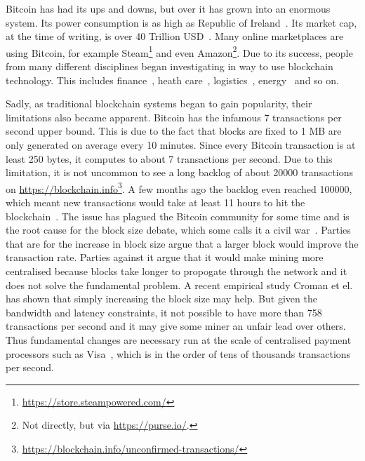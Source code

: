 Bitcoin has had its ups and downs, but over it has grown into an enormous system.
Its power consumption is as high as Republic of Ireland~\cite{o2014bitcoin}.
Its market cap, at the time of writing, is over 40 Trillion USD~\cite{bitcoinmarketcap}.
Many online marketplaces are using Bitcoin, for example Steam\footnote{\url{https://store.steampowered.com/}} and even Amazon\footnote{Not directly, but via \url{https://purse.io/}.}.
Due to its success, people from many different disciplines began investigating in way to use blockchain technology.
This includes finance~\cite{todo}, heath care~\cite{todo}, logistics~\cite{todo}, energy~\cite{todo} and so on.

Sadly, as traditional blockchain systems began to gain popularity,
their limitations also became apparent.
Bitcoin has the infamous 7 transactions per second upper bound.
This is due to the fact that blocks are fixed to 1 MB are only generated on average every 10 minutes.
Since every Bitcoin transaction is at least 250 bytes, it computes to about 7 transactions per second.
Due to this limitation, it is not uncommon to see a long backlog of about 20000 transactions on \url{https://blockchain.info}\footnote{\url{https://blockchain.info/unconfirmed-transactions/}}.
A few months ago the backlog even reached 100000, which meant new transactions would take at least 11 hours to hit the blockchain~\cite{bitcoinbacklog}.
The issue has plagued the Bitcoin community for some time and is the root cause for the block size debate, which some calls it a civil war~\cite{bitcoincivilwar}.
Parties that are for the increase in block size argue that a larger block would improve the transaction rate.
Parties against it argue that it would make mining more centralised because blocks take longer to propogate through the network and it does not solve the fundamental problem.
A recent empirical study Croman et el.~\cite{croman2016scaling} has shown that simply increasing the block size may help.
But given the bandwidth and latency constraints, it not possible to have more than 758 transactions per second and it may give some miner an unfair lead over others.
Thus fundamental changes are necessary run at the scale of centralised payment processors such as Visa~\cite{visa}, which is in the order of tens of thousands transactions per second.

